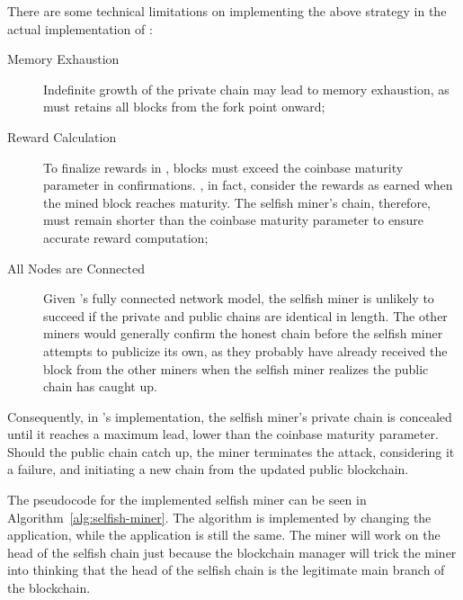 There are some technical limitations on implementing the above strategy in the
actual implementation of \iblock{}:
\begin{description}
	\item[Memory Exhaustion] Indefinite growth of the private chain may
		lead to memory exhaustion, as \iblock{} must retains all blocks
		from the fork point onward;
	\item[Reward Calculation] To finalize rewards in \iblock{}, blocks must
		exceed the coinbase maturity parameter in confirmations.
		\iblock{}, in fact, consider the rewards as earned when the
		mined block reaches maturity. The selfish miner's chain,
		therefore, must remain shorter than the coinbase maturity
		parameter to ensure accurate reward computation;
	\item[All Nodes are Connected] Given \iblock{}'s fully connected
		network model, the selfish miner is unlikely to succeed if the
		private and public chains are identical in length. The other
		miners would generally confirm the honest chain before the
		selfish miner attempts to publicize its own, as they probably
		have already received the block from the other miners when the
		selfish miner realizes the public chain has caught up.
\end{description}

Consequently, in \iblock{}'s implementation, the selfish miner's private chain
is concealed until it reaches a maximum lead, lower than the coinbase maturity
parameter. Should the public chain catch up, the miner terminates the attack,
considering it a failure, and initiating a new chain from the updated public
blockchain.

The pseudocode for the implemented selfish miner can be seen in
Algorithm~\ref{alg:selfish-miner}. The algorithm is implemented by changing the
 application, while the  application is
still the same. The miner will work on the head of the selfish chain just
because the blockchain manager will trick the miner into thinking that the head
of the selfish chain is the legitimate main branch of the blockchain.

